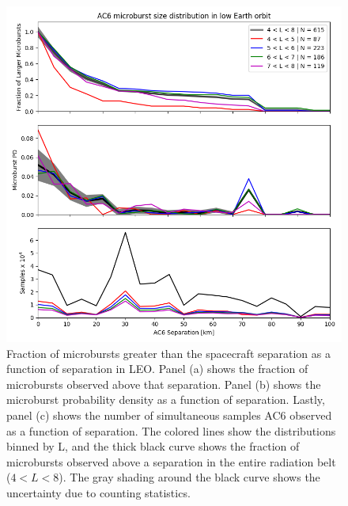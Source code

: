\documentclass[draft]{agujournal2019}
\begin{document}
\begin{figure}
\includegraphics[width=\textwidth]{fig3.png}
\caption{Fraction of microbursts greater than the spacecraft separation as a function of separation in LEO. Panel (a) shows the fraction of microbursts observed above that separation. Panel (b) shows the microburst probability density as a function of separation. Lastly, panel (c) shows the number of simultaneous samples AC6 observed as a function of separation. The colored lines show the distributions binned by L, and the thick black curve shows the fraction of microbursts observed above a separation in the entire radiation belt ($4 < L < 8$). The gray shading around the black curve shows the uncertainty due to counting statistics.}
\label{fig3}
\end{figure}
\end{document}
